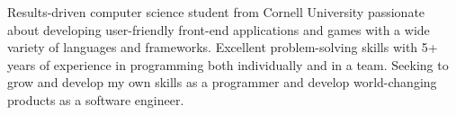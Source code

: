 
\begin{cvparagraph}
Results-driven computer science student from Cornell University passionate about developing user-friendly front-end applications and games with a wide variety of languages and frameworks. Excellent problem-solving skills with 5+ years of experience in programming both individually and in a team. Seeking to grow and develop my own skills as a programmer and develop world-changing products as a software engineer.
\end{cvparagraph}

